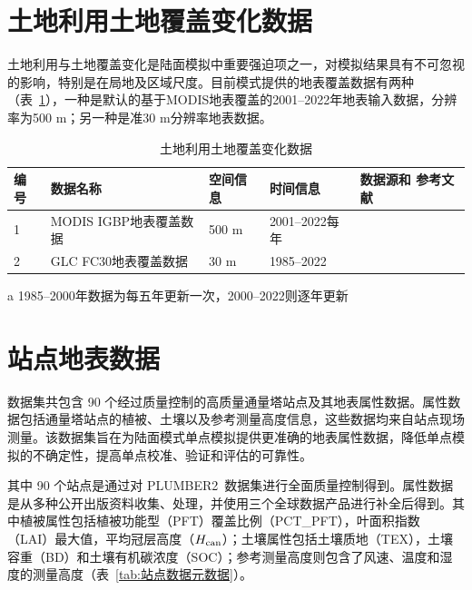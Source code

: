 \section{土地利用土地覆盖变化数据}

土地利用与土地覆盖变化是陆面模拟中重要强迫项之一，对模拟结果具有不可忽视的影响，特别是在局地及区域尺度。目前模式提供的地表覆盖数据有两种（表~\ref{tab:LULCC数据}），一种是默认的基于MODIS地表覆盖的2001--2022年地表输入数据，分辨率为500 m；另一种是准30 m分辨率地表数据。

\begin{table}[htbp]
  \begin{threeparttable}
    \centering
    \caption{土地利用土地覆盖变化数据}
    \label{tab:LULCC数据}
    \begin{tabular}{p{1cm}p{4.5cm}p{2cm}p{3cm}p{3cm}}
      \toprule
      编号 & 数据名称               & 空间信息 & 时间信息            & 数据源和 \newline 参考文献 \\
      \midrule
      1    & MODIS IGBP地表覆盖数据 & 500 m    & 2001--2022每年      & \cite{Friedl2019}          \\
      2    & GLC FC30地表覆盖数据   & 30 m     & 1985--2022\tnote{a} & \cite{zhang2023glc_fcs30d} \\
      \bottomrule
    \end{tabular}
    \begin{tablenotes}
    \item [a] 1985--2000年数据为每五年更新一次，2000--2022则逐年更新
    \end{tablenotes}
  \end{threeparttable}
\end{table}


\section{站点地表数据}

数据集共包含 90 个经过质量控制的高质量通量塔站点及其地表属性数据。属性数据包括通量塔站点的植被、土壤以及参考测量高度信息，这些数据均来自站点现场测量。该数据集旨在为陆面模式单点模拟提供更准确的地表属性数据，降低单点模拟的不确定性，提高单点校准、验证和评估的可靠性。

其中 90 个站点是通过对 PLUMBER2~\citep{ukkola2022flux}数据集进行全面质量控制得到。属性数据是从多种公开出版资料收集、处理，并使用三个全球数据产品进行补全后得到。其中植被属性包括植被功能型（PFT）覆盖比例（PCT\_PFT），叶面积指数
（LAI）最大值，平均冠层高度（$H_{\rm can}$）；土壤属性包括土壤质地（TEX），土壤容重（BD）和土壤有机碳浓度（SOC）；参考测量高度则包含了风速、温度和湿度的测量高度（表~\ref{tab:站点数据元数据}）。

